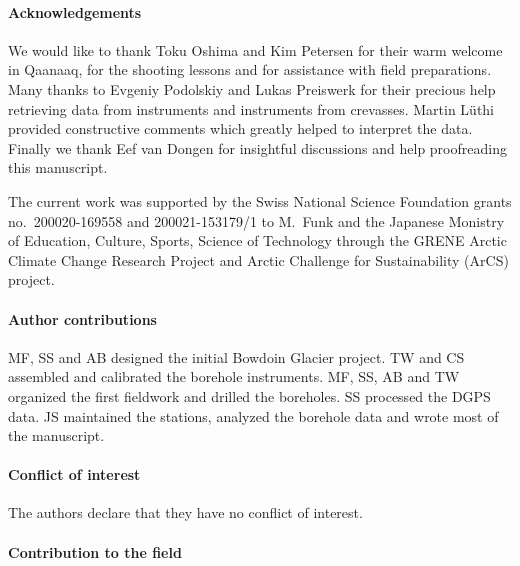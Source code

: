 \documentclass[utf8]{article}
\begin{document}

\paragraph{Acknowledgements}

    We would like to thank Toku Oshima and Kim Petersen for their warm welcome
    in Qaanaaq, for the shooting lessons and for assistance with field
    preparations. Many thanks to Evgeniy Podolskiy and Lukas Preiswerk for
    their precious help retrieving data from instruments and instruments from
    crevasses. Martin Lüthi provided constructive comments which greatly helped
    to interpret the data. Finally we thank Eef van Dongen for insightful
    discussions and help proofreading this manuscript.

    The current work was supported by the Swiss National Science Foundation
    grants no.~200020-169558 and 200021-153179/1 to M.~Funk and the Japanese
    Monistry of Education, Culture, Sports, Science of Technology through
    the GRENE Arctic Climate Change Research Project and Arctic Challenge for
    Sustainability (ArCS) project.

\paragraph{Author contributions}

    MF, SS and AB designed the initial Bowdoin Glacier project.
    TW and CS assembled and calibrated the borehole instruments.
    MF, SS, AB and TW organized the first fieldwork and drilled the boreholes.
    SS processed the DGPS data.
    JS maintained the stations, analyzed the borehole data and wrote most of
    the manuscript.

\paragraph{Conflict of interest}

    The authors declare that they have no conflict of interest.

\paragraph{Contribution to the field}
\end{document}
